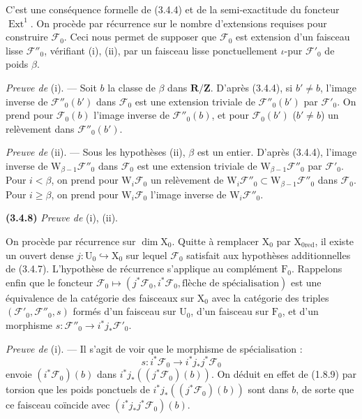 \documentclass[11pt,leqno]{article}
\begin{document}
C’est une conséquence formelle de (3.4.4) et de la semi-exactitude du foncteur \(\operatorname{Ext}^1\). On procède par récurrence sur le nombre d’extensions requises pour construire \(\mathscr F_0\). Ceci nous permet de supposer que \(\mathscr F_0\) est extension d’un faisceau lisse \(\mathscr F''_0\), vérifiant (i), (ii), par un faisceau lisse ponctuellement \(\iota\)-pur \(\mathscr F'_0\) de poids \(\beta\).

\textit{Preuve de} (i). — Soit \(b\) la classe de \(\beta\) dans \(\mathbf R/\mathbf Z\). D’après (3.4.4), si \(b'\ne b\), l’image inverse de \(\mathscr F''_0(b')\) dans \(\mathscr F_0\) est une extension triviale de \(\mathscr F''_0(b')\) par \(\mathscr F'_0\). On prend pour \(\mathscr F_0(b)\) l’image inverse de \(\mathscr F''_0(b)\), et pour \(\mathscr F_0(b')\) (\(b'\ne b\)) un relèvement dans \(\mathscr F''_0(b')\).

\textit{Preuve de} (ii). — Sous les hypothèses (ii), \(\beta\) est un entier. D’après (3.4.4), l’image inverse de \(\mathrm W_{\beta-1}\mathscr F''_0\) dans \(\mathscr F_0\) est une extension triviale de \(\mathrm W_{\beta-1}\mathscr F''_0\) par \(\mathscr F'_0\). Pour \(i<\beta\), on prend pour \(\mathrm W_i\mathscr F_0\) un relèvement de \(\mathrm W_i\mathscr F''_0\subset\mathrm W_{\beta-1}\mathscr F''_0\) dans \(\mathscr F_0\). Pour \(i\geq\beta\), on prend pour \(\mathrm W_i\mathscr F_0\) l’image inverse de \(\mathrm W_i\mathscr F''_0\).

\textbf{(3.4.8)} \textit{Preuve de} (i), (ii).

On procède par récurrence sur \(\dim\mathrm X_0\). Quitte à remplacer \(\mathrm X_0\) par \(\mathrm X_{0\mathrm{red}}\), il existe un ouvert dense \(j:\mathrm U_0\hookrightarrow\mathrm X_0\) sur lequel \(\mathscr F_0\) satisfait aux hypothèses additionnelles de (3.4.7). L’hypothèse de récurrence s’applique au complément \(\mathrm F_0\). Rappelons enfin que le foncteur \(\mathscr F_0\mapsto(j^*\mathscr F_0,i^*\mathscr F_0,\text{flèche de spécialisation})\) est une équivalence de la catégorie des faisceaux sur \(\mathrm X_0\) avec la catégorie des triples \((\mathscr F'_0,\mathscr F''_0,s)\) formés d’un faisceau sur \(\mathrm U_0\), d’un faisceau sur \(\mathrm F_0\), et d’un morphisme \(s:\mathscr F''_0\to i^*j_*\mathscr F'_0\).

\textit{Preuve de} (i). — Il s’agit de voir que le morphisme de spécialisation :
\[
s:i^*\mathscr F_0\to i^*j_*j^*\mathscr F_0
\]
envoie \((i^*\mathscr F_0)(b)\) dans \(i^*j_*((j^*\mathscr F_0)(b))\). On déduit en effet de (1.8.9) par torsion que les poids ponctuels de \(i^*j_*((j^*\mathscr F_0)(b))\) sont dans \(b\), de sorte que ce faisceau coïncide avec \((i^*j_*j^*\mathscr F_0)(b)\).
\end{document}

